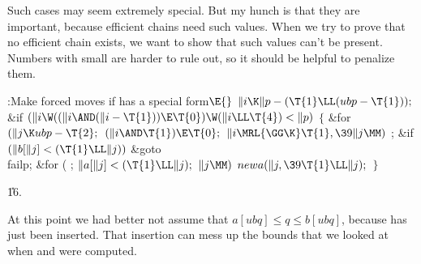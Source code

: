 Such cases may seem extremely special. But my hunch is that they are
important, because efficient chains need such values. When we try
to prove that no efficient chain exists, we want to show that
such values can't be present. Numbers with small  are harder
to rule out, so it should be helpful to penalize them.

\Y\B\4:Make forced moves if  has a special form\X${}\E{}$\6
$\|i\K\|p-(\T{1}\LL(\\{ubp}-\T{1}));{}$\6
\&{if} ${}(\|i\W((\|i\AND(\|i-\T{1}))\E\T{0})\W(\|i\LL\T{4})<\|p){}$\5
${}\{{}$\1\6
\&{for} ${}(\|j\K\\{ubp}-\T{2};{}$ ${}(\|i\AND\T{1})\E\T{0};{}$ ${}\|i\MRL{{%
\GG}{\K}}\T{1},\39\|j\MM){}$\1\5
;\2\6
\&{if} ${}(\|b[\|j]<(\T{1}\LL\|j)){}$\1\5
\&{goto} \\{failp};\2\6
\&{for} ( ; ${}\|a[\|j]<(\T{1}\LL\|j);{}$ ${}\|j\MM){}$\1\5
${}\\{newa}(\|j,\39\T{1}\LL\|j);{}$\2\6
\4${}\}{}$\2\par
\U16.\fi

At this point we had better not assume that $a[ubq]\le
q\le b[ubq]$,
because  has just been inserted. That insertion can mess up the
bounds that we looked at when  and  were computed.

